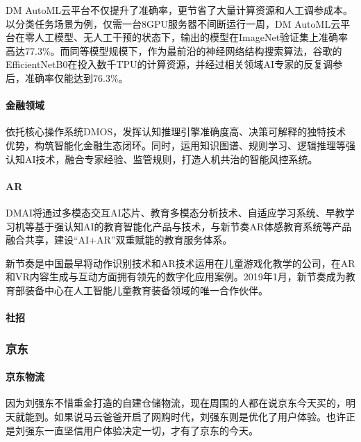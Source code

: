 \documentclass[letterpaper,11pt,english]{sphinxmanual}
\begin{document}
DM
AutoML云平台不仅提升了准确率，更节省了大量计算资源和人工调参成本。以分类任务场景为例，仅需一台8GPU服务器不间断运行一周，DM
AutoML云平台在零人工模型、无人工干预的状态下，输出的模型在ImageNet验证集上准确率高达77.3\%。而同等模型规模下，作为最前沿的神经网络结构搜索算法，谷歌的EfficientNetB0在投入数千TPU的计算资源，并经过相关领域AI专家的反复调参后，准确率仅能达到76.3\%。


\paragraph{金融领域}
\label{\detokenize{chapter_company/dm-ai:id12}}
依托核心操作系统DMOS，发挥认知推理引擎准确度高、决策可解释的独特技术优势，构筑智能化金融生态闭环。同时，运用知识图谱、规则学习、逻辑推理等强认知AI技术，融合专家经验、监管规则，打造人机共治的智能风控系统。


\paragraph{AR}
\label{\detokenize{chapter_company/dm-ai:ar}}
DMAI将通过多模态交互AI芯片、教育多模态分析技术、自适应学习系统、早教学习机等基于强认知AI的教育智能化产品与技术，与新节奏AR体感教育系统等产品融合共享，建设“AI+AR”双重赋能的教育服务体系。

新节奏是中国最早将动作识别技术和AR技术运用在儿童游戏化教学的公司，在AR和VR内容生成与互动方面拥有领先的数字化应用案例。2019年1月，新节奏成为教育部装备中心在人工智能儿童教育装备领域的唯一合作伙伴。


\paragraph{社招}
\label{\detokenize{chapter_company/dm-ai:id13}}


\subsubsection{京东}
\label{\detokenize{chapter_company/jd:id1}}\label{\detokenize{chapter_company/jd::doc}}

\paragraph{京东物流}
\label{\detokenize{chapter_company/jd:id2}}
因为刘强东不惜重金打造的自建仓储物流，现在周围的人都在说京东今天买的，明天就能到。如果说马云爸爸开启了网购时代，刘强东则是优化了用户体验。也许正是刘强东一直坚信用户体验决定一切，才有了京东的今天。%
\begin{footnote}[897]\sphinxAtStartFootnote
{}
%
\end{footnote}
\end{document}
